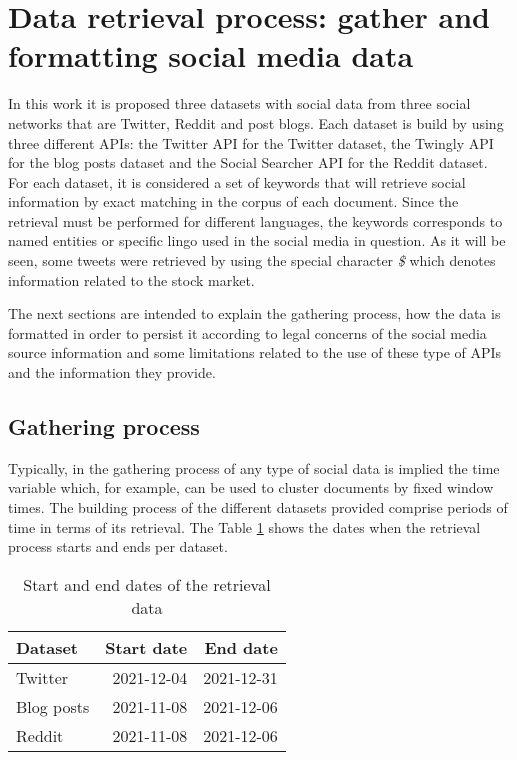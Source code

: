 \section{Data retrieval process: gather and formatting social media data}

In this work it is proposed three datasets with social data from three social networks that are Twitter, Reddit and post blogs. Each dataset is build by using three different APIs: the Twitter API for the Twitter dataset, the Twingly API for the blog posts dataset and the Social Searcher API for the Reddit dataset. For each dataset, it is considered a set of keywords that will retrieve social information by exact matching in the corpus of each document. Since the retrieval must be performed for different languages, the keywords corresponds to named entities or specific lingo used in the social media in question. As it will be seen, some tweets were retrieved by using the special character \textit{\$} which denotes information related to the stock market.

\par The next sections are intended to explain the gathering process, how the data is formatted in order to persist it according to legal concerns of the social media source information and some limitations related to the use of these type of APIs and the information they provide.
\subsection{Gathering process}
Typically, in the gathering process of any type of social data is implied the time variable which, for example,  can be used to cluster documents by fixed window times. The building process of the different datasets provided comprise periods of time in terms of its retrieval. The Table \ref{table:periodTime} shows the dates when the retrieval process starts and ends per dataset.

\begin{table}[htb]
	\begin{center}
		\begin{tabular}{|l|r|r|}
			\hline
			\textbf{Dataset} &    \textbf{Start date } &\textbf{ End date}\\
			\hline \hline
			Twitter              &  2021-12-04  &  2021-12-31\\ 
			\hline
			Blog posts &  2021-11-08 	& 2021-12-06 \\
			\hline
			Reddit &  2021-11-08   	& 2021-12-06 \\
			\hline
		\end{tabular}
	\end{center}
	\caption{Start and end dates of the retrieval data}
	\label{table:periodTime}
\end{table}

